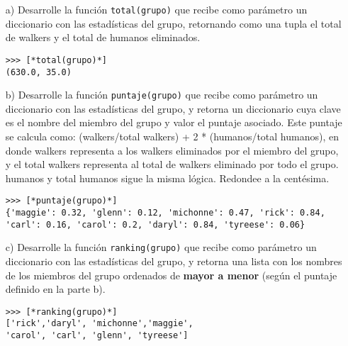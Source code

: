 \begin{itemize}
    \item[a)] Desarrolle la función \texttt{total(grupo)} que recibe como parámetro un diccionario con las estadísticas del grupo, retornando como una tupla el total de walkers y el total de humanos eliminados.
    \begin{lstlisting}[style=consola]
>>> [*total(grupo)*]
(630.0, 35.0)
    \end{lstlisting}
    \item[b)] Desarrolle la función \texttt{puntaje(grupo)} que recibe como parámetro un diccionario con las estadísticas del grupo, y retorna un diccionario cuya clave es el nombre del miembro del grupo y valor el puntaje asociado. Este puntaje se calcula como: (walkers/total walkers) + 2 * (humanos/total humanos), en donde walkers representa a los walkers eliminados por el miembro del grupo, y el total walkers representa al total de walkers eliminado por todo el grupo. humanos y total humanos sigue la misma lógica. Redondee a la centésima.
    \begin{lstlisting}[style=consola]
>>> [*puntaje(grupo)*]
{'maggie': 0.32, 'glenn': 0.12, 'michonne': 0.47, 'rick': 0.84,
'carl': 0.16, 'carol': 0.2, 'daryl': 0.84, 'tyreese': 0.06}
    \end{lstlisting}
    \item[c)]Desarrolle la función \texttt{ranking(grupo)} que recibe como parámetro un diccionario con las estadísticas del grupo, y retorna una lista con los nombres de los miembros del grupo ordenados de \textbf{mayor a menor} (según el puntaje definido en la parte b).
    \begin{lstlisting}[style=consola]
>>> [*ranking(grupo)*]
['rick','daryl', 'michonne','maggie', 
'carol', 'carl', 'glenn', 'tyreese']
    \end{lstlisting}
\end{itemize}
